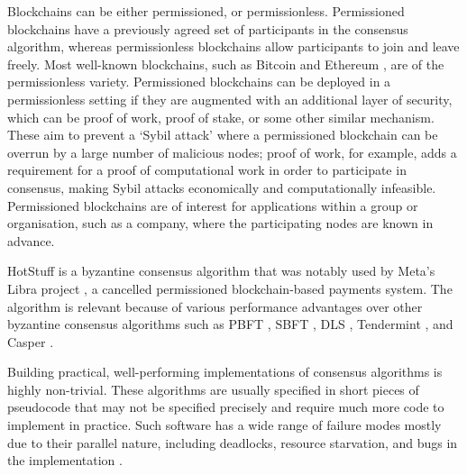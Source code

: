 Blockchains can be either permissioned, or permissionless. Permissioned blockchains have a previously agreed set of participants in the consensus algorithm, whereas permissionless blockchains allow participants to join and leave freely. Most well-known blockchains, such as Bitcoin \cite{nakamoto_bitcoin_nodate} and Ethereum \cite{wood_ethereum_nodate}, are of the permissionless variety. Permissioned blockchains can be deployed in a permissionless setting if they are augmented with an additional layer of security, which can be proof of work, proof of stake, or some other similar mechanism. These aim to prevent a `Sybil attack' where a permissioned blockchain can be overrun by a large number of malicious nodes; proof of work, for example, adds a requirement for a proof of computational work in order to participate in consensus, making Sybil attacks economically and computationally infeasible. Permissioned blockchains are of interest for applications within a group or organisation, such as a company, where the participating nodes are known in advance.

HotStuff is a byzantine consensus algorithm that was notably used by Meta's Libra project \cite{baudet_state_nodate}, a cancelled permissioned blockchain-based payments system. The algorithm is relevant because of various performance advantages over other byzantine consensus algorithms such as PBFT \cite{castro_practical_nodate}, SBFT \cite{golan_gueta_sbft_2019}, DLS \cite{dwork_consensus_nodate}, Tendermint \cite{kwon_tendermint_nodate}, and Casper \cite{buterin_casper_2019}.


Building practical, well-performing implementations of consensus algorithms is highly non-trivial. These algorithms are usually specified in short pieces of pseudocode that may not be specified precisely and require much more code to implement in practice. Such software has a wide range of failure modes mostly due to their parallel nature, including deadlocks, resource starvation, and bugs in the implementation \cite{chubby}.


